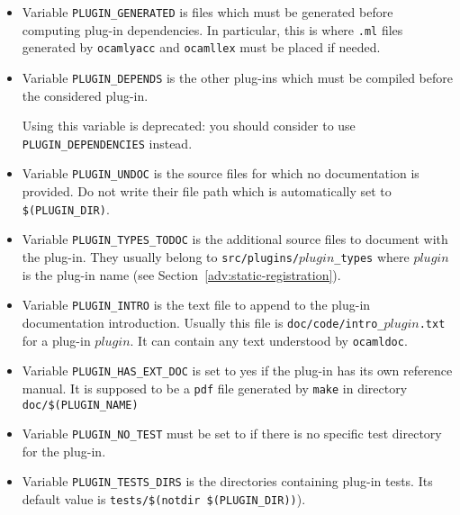 \begin{itemize}
\item Variable
  \texttt{PLUGIN\_GENERATED} is
  files which must be generated before computing plug-in dependencies. In
  particular, this is where \texttt{.ml} files generated by \texttt{ocamlyacc}
  and \texttt{ocamllex} must be placed if needed.
\item Variable
  \texttt{PLUGIN\_DEPENDS} is the
  other plug-ins which must be compiled before the considered plug-in. 

  \begin{important}
    Using this variable is deprecated: you should consider to use
    \texttt{PLUGIN\_DEPENDENCIES} instead.
  \end{important}
%
\item Variable
  \texttt{PLUGIN\_UNDOC} is the
  source files for which no documentation is provided. Do not write their file
  path which is automatically set to
  \texttt{\$(PLUGIN\_DIR)}.
\item Variable \texttt{PLUGIN\_TYPES\_TODOC}%
   is the additional source
  files to document with the plug-in. They usually belong to
  \texttt{src/plugins/$plugin$\_types} where $plugin$ is the plug-in name (see
  Section~\ref{adv:static-registration}).
\item Variable
  \texttt{PLUGIN\_INTRO} is the
  text file to append to the plug-in documentation introduction. Usually this
  file is \texttt{doc/code/intro\_$plugin$.txt} for a plug-in $plugin$. It can
  contain any text understood by \texttt{ocamldoc}.
\item Variable
 \texttt{PLUGIN\_HAS\_EXT\_DOC}%
  is set to yes if
 the plug-in has its own reference manual. It is supposed to be a
 \texttt{pdf} file generated by \texttt{make} in directory
 \texttt{doc/\$(PLUGIN\_NAME)}
%
\item Variable
  \texttt{PLUGIN\_NO\_TEST} must
  be set to \yes if there is no specific test directory for the
  plug-in.
\item Variable
  \texttt{PLUGIN\_TESTS\_DIRS}
  is the directories containing plug-in tests. Its default value is
  \texttt{tests/\$(notdir \$(PLUGIN\_DIR))}).

\end{itemize}
